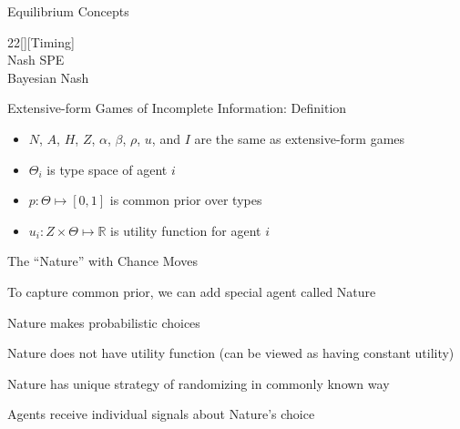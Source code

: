 \documentclass[11pt,aspectratio=169,handout]{beamer}
\begin{document}
  \begin{frame}{Equilibrium Concepts}
   \begin{center}
   \renewcommand{\gamestretch}{4}
   \ssualfalse
   \setlength{\fboxrule}{0em}
   \setlength{\fboxsep}{0.5em} 
    \begin{game}{2}{2}[{\Large{}}][\Large Timing]
     \> {\footnotesize{}}	\> {\footnotesize{}}	\\
     {\footnotesize{}}	\> Nash	\> SPE \\
     {\footnotesize{}} \> Bayesian Nash \> 
    \end{game}
   \end{center}
  \end{frame}
  
  
  \begin{frame}{Extensive-form Games of Incomplete Information: Definition}
   \begin{itemize}
   \setlength{\itemsep}{1.5em}
    \item $N$, $A$, $H$, $Z$, $\alpha$, $\beta$, $\rho$, $u$, and $I$ are the same as extensive-form games
    \item $\Theta_i$ is type space of agent $i$
    \item $p: \Theta \mapsto [0, 1]$ is common prior over types
    \item $u_i: Z \times \Theta \mapsto \mathbb{R}$ is utility function for agent $i$
   \end{itemize}
  \end{frame}
  
 
  \begin{frame}{The ``Nature'' with Chance Moves}
   \begin{itemizes}[1.2em]
    \item To capture common prior, we can add special agent called \alert{Nature}
    \item Nature makes \alert{probabilistic choices}
    \item Nature \alert{does not} have utility function (can be viewed as having constant utility)
    \item Nature has unique strategy of randomizing in \alert{commonly known} way
    \item Agents receive individual signals about Nature's choice
   \end{itemizes}
  \end{frame}
  
\end{document}

